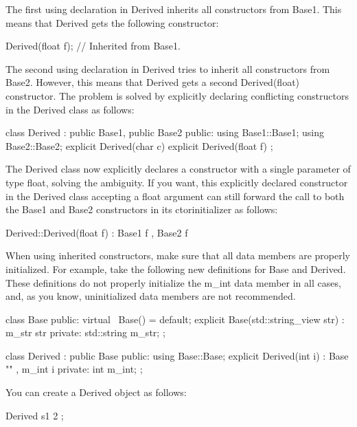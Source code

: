 The first using declaration in Derived inherits all constructors from Base1. This means that Derived gets the following constructor:

\begin{cpp}
Derived(float f); // Inherited from Base1.
\end{cpp}

The second using declaration in Derived tries to inherit all constructors from Base2. However, this means that Derived gets a second Derived(float) constructor. The problem is solved by explicitly declaring conflicting constructors in the Derived class as follows:

\begin{cpp}
class Derived : public Base1, public Base2
{
    public:
        using Base1::Base1;
        using Base2::Base2;
        explicit Derived(char c) {}
        explicit Derived(float f) {}
};
\end{cpp}

The Derived class now explicitly declares a constructor with a single parameter of type float, solving the ambiguity. If you want, this explicitly declared constructor in the Derived class accepting a float argument can still forward the call to both the Base1 and Base2 constructors in its ctorinitializer as follows:

\begin{cpp}
Derived::Derived(float f) : Base1 { f }, Base2 { f } {}
\end{cpp}


When using inherited constructors, make sure that all data members are properly initialized. For example, take the following new definitions for Base and Derived. These definitions do not properly initialize the m\_int data member in all cases, and, as you know, uninitialized data members are not recommended.

\begin{cpp}
class Base
{
    public:
        virtual ~Base() = default;
        explicit Base(std::string_view str) : m_str { str } {}
    private:
        std::string m_str;
};

class Derived : public Base
{
    public:
        using Base::Base;
        explicit Derived(int i) : Base { "" }, m_int { i } {}
    private:
        int m_int;
};
\end{cpp}

You can create a Derived object as follows:

\begin{cpp}
Derived s1 { 2 };
\end{cpp}

